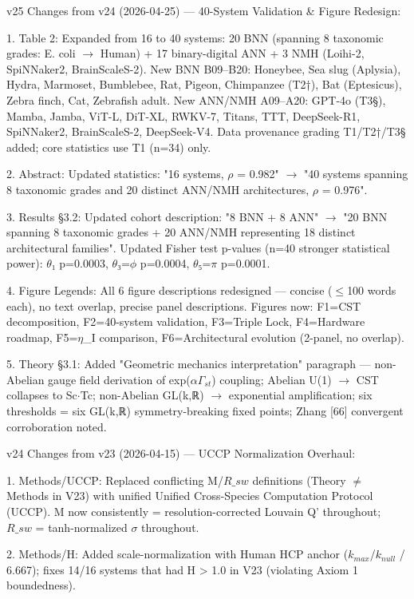 \documentclass[a4paper,12pt]{article}
\begin{document}
v25 Changes from v24 (2026-04-25) --- 40-System Validation \& Figure Redesign:

1. Table 2: Expanded from 16 to 40 systems: 20 BNN (spanning 8 taxonomic grades: E. coli $\rightarrow$ Human) + 17 binary-digital ANN + 3 NMH (Loihi-2, SpiNNaker2, BrainScaleS-2). New BNN B09--B20: Honeybee, Sea slug (Aplysia), Hydra, Marmoset, Bumblebee, Rat, Pigeon, Chimpanzee (T2†), Bat (Eptesicus), Zebra finch, Cat, Zebrafish adult. New ANN/NMH A09--A20: GPT-4o (T3§), Mamba, Jamba, ViT-L, DiT-XL, RWKV-7, Titans, TTT, DeepSeek-R1, SpiNNaker2, BrainScaleS-2, DeepSeek-V4. Data provenance grading T1/T2†/T3§ added; core statistics use T1 (n=34) only.

2. Abstract: Updated statistics: "16 systems, $\rho$ = 0.982" $\rightarrow$ "40 systems spanning 8 taxonomic grades and 20 distinct ANN/NMH architectures, $\rho$ = 0.976".

3. Results §3.2: Updated cohort description: "8 BNN + 8 ANN" $\rightarrow$ "20 BNN spanning 8 taxonomic grades + 20 ANN/NMH representing 18 distinct architectural families". Updated Fisher test p-values (n=40 stronger statistical power): $\theta$₁ p=0.0003, $\theta$₃=$\phi$ p=0.0004, $\theta$₅=$\pi$ p=0.0001.

4. Figure Legends: All 6 figure descriptions redesigned --- concise ($\leq$100 words each), no text overlap, precise panel descriptions. Figures now: F1=CST decomposition, F2=40-system validation, F3=Triple Lock, F4=Hardware roadmap, F5=$\eta$_I comparison, F6=Architectural evolution (2-panel, no overlap).

5. Theory §3.1: Added "Geometric mechanics interpretation" paragraph --- non-Abelian gauge field derivation of exp($\alpha$\cdot$\Gamma_{st}$) coupling; Abelian U(1) $\rightarrow$ CST collapses to Sc$\cdot$Tc; non-Abelian GL(k,ℝ) $\rightarrow$ exponential amplification; six thresholds = six GL(k,ℝ) symmetry-breaking fixed points; Zhang [66] convergent corroboration noted.

v24 Changes from v23 (2026-04-15) --- UCCP Normalization Overhaul:

1. Methods/UCCP: Replaced conflicting M/$R\_{sw}$ definitions (Theory $\neq$ Methods in V23) with unified Unified Cross-Species Computation Protocol (UCCP). M now consistently = resolution-corrected Louvain Q' throughout; $R\_{sw}$ = tanh-normalized $\sigma$ throughout.

2. Methods/H: Added scale-normalization with Human HCP anchor ($k_{max}$/$k_{null}$ / 6.667); fixes 14/16 systems that had H > 1.0 in V23 (violating Axiom 1 boundedness).
\end{document}

